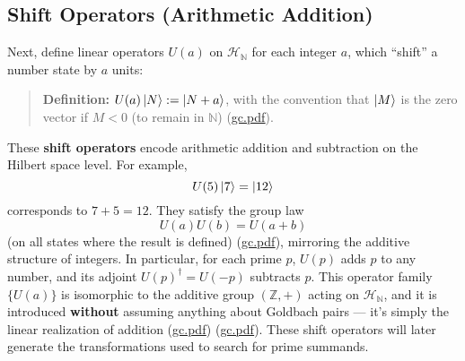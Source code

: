 \documentclass[12pt]{article}
\begin{document}
\subsection{Shift Operators (Arithmetic Addition)}
Next, define linear operators $U(a)$ on $\mathcal{H}_{\mathbb{N}}$ for each integer $a$, which “shift” a number state by $a$ units:
\begin{quote}
\textbf{Definition:} $U(a)\ket{N} := \ket{N+a}$, with the convention that $\ket{M}$ is the zero vector if $M<0$ (to remain in $\mathbb{N}$) (\href{file://file-7ZYYwSHWVa83XEVTrEhg5z#:~:text=Definition%202%20,p%29%24%20shifts%20a}{gc.pdf}).
\end{quote}
These \textbf{shift operators} encode arithmetic addition and subtraction on the Hilbert space level. For example, 
\[
U(5)\ket{7}=\ket{12}
\]
corresponds to $7+5=12$. They satisfy the group law 
\[
U(a)U(b)=U(a+b)
\]
(on all states where the result is defined) (\href{file://file-7ZYYwSHWVa83XEVTrEhg5z#:~:text=the%20existence%20of%20%24U,states%20where%20both%20sides%20are}{gc.pdf}), mirroring the additive structure of integers. In particular, for each prime $p$, $U(p)$ adds $p$ to any number, and its adjoint $U(p)^\dagger = U(-p)$ subtracts $p$. This operator family $\{U(a)\}$ is isomorphic to the additive group $(\mathbb{Z},+)$ acting on $\mathcal{H}_{\mathbb{N}}$, and it is introduced \textbf{without} assuming anything about Goldbach pairs --- it’s simply the linear realization of addition (\href{file://file-7ZYYwSHWVa83XEVTrEhg5z#:~:text=within%20the%20Hilbert%20space,translations%20on%20the%20number%20line}{gc.pdf}) (\href{file://file-7ZYYwSHWVa83XEVTrEhg5z#:~:text=isomorphic%20to%20the%20additive%20group,the%20group%20law%20of%20addition}{gc.pdf}). These shift operators will later generate the transformations used to search for prime summands.
\end{document}
